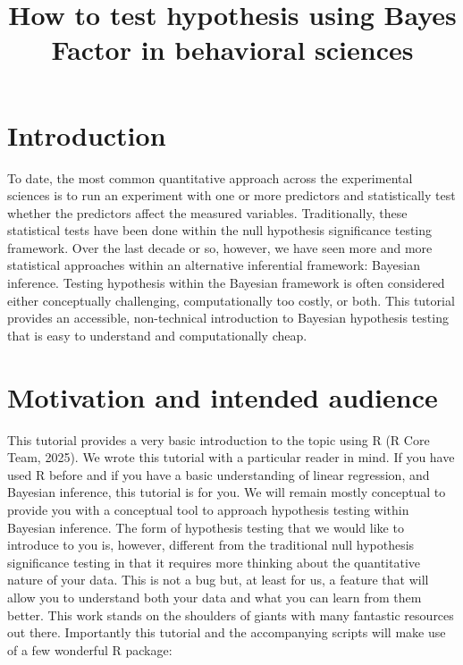 \documentclass[
  doc,
  longtable,
  nolmodern,
  notxfonts,
  notimes,
  colorlinks=true,linkcolor=blue,citecolor=blue,urlcolor=blue]{apa7}
\title{How to test hypothesis using Bayes Factor in behavioral sciences}
\begin{document}
\maketitle



\setcounter{secnumdepth}{3}

\setlength\LTleft{0pt}




\section{Introduction}\label{introduction}

To date, the most common quantitative approach across the experimental
sciences is to run an experiment with one or more predictors and
statistically test whether the predictors affect the measured variables.
Traditionally, these statistical tests have been done within the null
hypothesis significance testing framework. Over the last decade or so,
however, we have seen more and more statistical approaches within an
alternative inferential framework: Bayesian inference. Testing
hypothesis within the Bayesian framework is often considered either
conceptually challenging, computationally too costly, or both. This
tutorial provides an accessible, non-technical introduction to Bayesian
hypothesis testing that is easy to understand and computationally cheap.

\section{Motivation and intended
audience}\label{motivation-and-intended-audience}

This tutorial provides a very basic introduction to the topic using R (R
Core Team, 2025). We wrote this tutorial with a particular reader in
mind. If you have used R before and if you have a basic understanding of
linear regression, and Bayesian inference, this tutorial is for you. We
will remain mostly conceptual to provide you with a conceptual tool to
approach hypothesis testing within Bayesian inference. The form of
hypothesis testing that we would like to introduce to you is, however,
different from the traditional null hypothesis significance testing in
that it requires more thinking about the quantitative nature of your
data. This is not a bug but, at least for us, a feature that will allow
you to understand both your data and what you can learn from them
better. This work stands on the shoulders of giants with many fantastic
resources out there. Importantly this tutorial and the accompanying
scripts will make use of a few wonderful R package:
\end{document}
